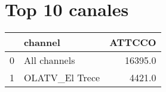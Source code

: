 \documentclass{article}%
\begin{document}
%
\normalsize%
\section{Top 10 canales}%
\label{sec:Top10canales}%
\begin{tabular}{llr}
\toprule
{} &         channel &   ATTCCO \\
\midrule
0 &    All channels &  16395.0 \\
1 &  OLATV\_El Trece &   4421.0 \\
\bottomrule
\end{tabular}

%
\end{document}
